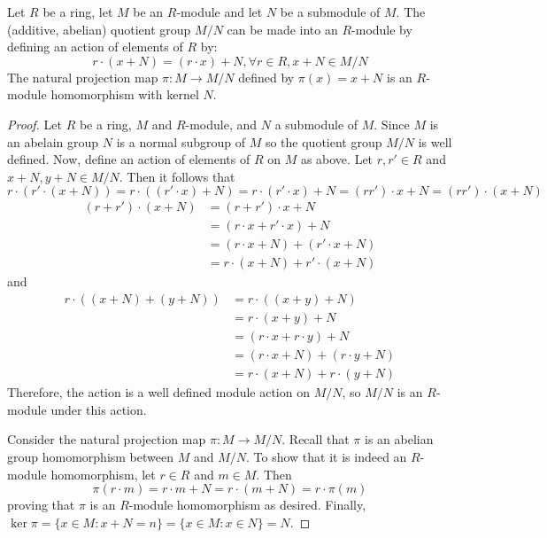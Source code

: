 \begin{prop}
    Let $R$ be a ring, let $M$ be an $R$-module and let $N$ be a submodule of $M$. The (additive, abelian) quotient group $M/N$ can be made into an $R$-module by defining an action of elements of $R$ by: \begin{equation*}
        r\cdot(x+N) = (r\cdot x)+N,\forall r \in R, x+N \in M/N
    \end{equation*}
    The natural projection map $\pi:M\rightarrow M/N$ defined by $\pi(x) = x+N$ is an $R$-module homomorphism with kernel $N$.
\end{prop}
\begin{proof}
    Let $R$ be a ring, $M$ and $R$-module, and $N$ a submodule of $M$. Since $M$ is an abelain group $N$ is a normal subgroup of $M$ so the quotient group $M/N$ is well defined. Now, define an action of elements of $R$ on $M$ as above. Let $r,r' \in R$ and $x+N,y+N \in M/N$. Then it follows that \begin{equation*}
        r\cdot(r'\cdot(x+N)) = r\cdot((r'\cdot x)+N) = r\cdot(r'\cdot x)+N = (rr')\cdot x + N = (rr')\cdot(x+N)
    \end{equation*}
    \begin{align*}
        (r+r')\cdot(x+N) &= (r+r')\cdot x+N \\
        &= (r\cdot x + r'\cdot x)+N \\
        &= (r\cdot x + N) + (r'\cdot x + N) \\
        &= r\cdot(x+N)+r'\cdot(x+N)
    \end{align*}
    and \begin{align*}
        r\cdot ((x+N)+(y+N)) &= r\cdot((x+y)+N) \\
        &= r\cdot(x+y)+N \\
        &= (r\cdot x + r\cdot y) + N\\
        &= (r\cdot x + N) + (r\cdot y +N) \\
        &= r\cdot (x+N) +r\cdot (y+N)
    \end{align*}
    Therefore, the action is a well defined module action on $M/N$, so $M/N$ is an $R$-module under this action.

    Consider the natural projection map $\pi:M\rightarrow M/N$. Recall that $\pi$ is an abelian group homomorphism between $M$ and $M/N$. To show that it is indeed an $R$-module homomorphism, let $r \in R$ and $m \in M$. Then \begin{equation*}
        \pi(r\cdot m) = r\cdot m + N = r\cdot(m+N) = r\cdot \pi(m)
    \end{equation*}
    proving that $\pi$ is an $R$-module homomorphism as desired. Finally, $\ker\pi = \{x \in M:x+N = n\} = \{x\in M:x \in N\} = N$.
\end{proof}


